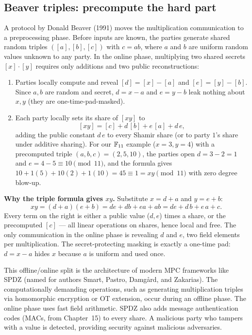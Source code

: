 \subsection{Beaver triples: precompute the hard part}

A protocol by Donald Beaver (1991) moves the multiplication communication to a preprocessing phase. Before inputs are known, the parties generate shared random triples $([a], [b], [c])$ with $c = ab$, where $a$ and $b$ are uniform random values unknown to any party. In the online phase, multiplying two shared secrets $[x]\cdot[y]$ requires only additions and two public reconstructions:

\begin{enumerate}
  \item Parties locally compute and reveal $[d] = [x] - [a]$ and $[e] = [y] - [b]$. Since $a, b$ are random and secret, $d = x - a$ and $e = y - b$ leak nothing about $x, y$ (they are one-time-pad-masked).
  \item Each party locally sets its share of $[xy]$ to
  \[
    [xy] = [c] + d\,[b] + e\,[a] + d\,e,
  \]
  adding the public constant $d\,e$ to every Shamir share (or to party $1$'s share under additive sharing). For our $\mathbb{F}_{11}$ example ($x = 3, y = 4$) with a precomputed triple $(a, b, c) = (2, 5, 10)$, the parties open $d = 3 - 2 = 1$ and $e = 4 - 5 \equiv 10 \pmod{11}$, and the formula gives $10 + 1(5) + 10(2) + 1(10) = 45 \equiv 1 = xy \pmod{11}$ with zero degree blow-up.
\end{enumerate}

\begin{whybox}
\textbf{Why the triple formula gives $xy$.} Substitute $x = d + a$ and $y = e + b$:
\[
xy = (d+a)(e+b) = de + d b + e a + ab = de + d\,b + e\,a + c.
\]
Every term on the right is either a public value ($d, e$) times a share, or the precomputed $[c]$ --- all linear operations on shares, hence local and free. The only communication in the online phase is revealing $d$ and $e$, two field elements per multiplication. The secret-protecting masking is exactly a one-time pad: $d = x - a$ hides $x$ because $a$ is uniform and used once.
\end{whybox}

\begin{focusbox}
This offline/online split is the architecture of modern MPC frameworks like SPDZ (named for authors Smart, Pastro, Damgård, and Zakarias). The computationally demanding operations, such as generating multiplication triples via homomorphic encryption or OT extension, occur during an offline phase. The online phase uses fast field arithmetic. SPDZ also adds message authentication codes (MACs, from Chapter~15) to every share. A malicious party who tampers with a value is detected, providing security against malicious adversaries.
\end{focusbox}


